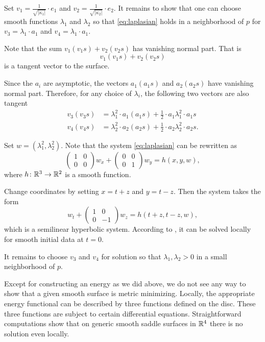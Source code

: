 \documentclass{article}
\begin{document}
Set $v_1=\tfrac 1{\sqrt{|\kappa_1|}}\cdot e_1$ and $v_2=\tfrac 1{\sqrt{|\kappa_2|}}\cdot e_2$. 
It remains to show that one can choose smooth functions  $\lambda_1$ and $\lambda_2$ 
so that \ref{eq:laplasian}
holds in a neighborhood of $p$ for $v_3=\lambda_1\cdot a_1$ and $v_4=\lambda_1\cdot a_1$.

Note that the sum $v_1(v_1s)+v_2(v_2s)$ has vanishing normal part.
That is \[v_1(v_1s)+v_2(v_2s)\] is a tangent vector to the surface.

Since the $a_i$ are asymptotic,
the vectors $a_1(a_1s)$ and $a_2(a_2s)$ have vanishing normal part.
Therefore, for any choice of $\lambda_i$,
the following two vectors are also tangent
\begin{align*}
v_3(v_3s)&=\lambda_1^2\cdot a_1(a_1s)+\tfrac12\cdot a_1\lambda_1^2\cdot a_1s
\\
v_4(v_4s)&=\lambda_2^2\cdot a_2(a_2s)+\tfrac12\cdot a_2\lambda_2^2\cdot a_2s.
\end{align*}

Set $w=(\lambda_1^2,\lambda_2^2)$.
Note that the system \ref{eq:laplasian} can be rewritten as 
\[\left(\begin{smallmatrix}
   1&0\\0&0
  \end{smallmatrix}\right)
w_x
+
\left(\begin{smallmatrix}
   0&0\\0&1
  \end{smallmatrix}\right)
w_y=h(x,y,w),\]
where $h\colon\mathbb{R}^3\to\mathbb{R}^2$ is a smooth function.

Change coordinates by setting $x=t+z$ and $y=t-z$.
Then the system takes the form 
\[w_t+\left(\begin{smallmatrix}
   1&0\\0&-1
  \end{smallmatrix}\right)
w_z=h(t+z,t-z,w),\]
which is a semilinear hyperbolic system.
According to \cite[Theorem 3.6]{bressan}, it can be solved locally for smooth initial data at $t=0$.

It remains to choose $v_3$ and $v_4$ for solution so that $\lambda_1, \lambda_2>0$ in a small neighborhood of $p$.
\qeds

Except for constructing an energy as we did above,
we do not see any way to show that a given smooth surface is metric minimizing.
Locally, the appropriate energy functional can be described by three functions defined on the disc.
These three functions are subject to certain differential equations.
Straightforward computations show that on generic smooth saddle surfaces in $\mathbb{R}^4$ 
there is no solution even locally.
\end{document}
